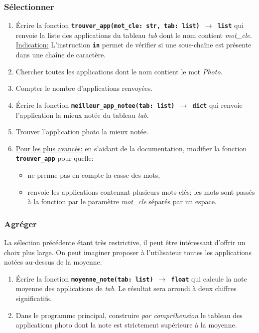 \documentclass[a4paper,11pt]{article}
\begin{document}
\subsubsection{Sélectionner}
\begin{activite}
    \begin{enumerate}
        \item Écrire la fonction \textbf{\texttt{trouver\_app(mot\_cle: str, tab: list) $\rightarrow$ list}} qui renvoie la liste des applications du tableau \emph{tab} dont le nom contient \emph{mot\_cle}.\\
              \underline{Indication:} L'instruction \textbf{\texttt{in}} permet de vérifier si une sous-chaîne est présente dans une chaîne de caractère.
        \item Chercher toutes les applications dont le nom contient le mot \emph{Photo}.
        \item Compter le nombre d'applications renvoyées.
        \item Écrire la fonction \textbf{\texttt{meilleur\_app\_notee(tab: list) $\rightarrow$ dict}} qui renvoie l'application la mieux notée du tableau \emph{tab}.
        \item Trouver l'application photo la mieux notée.
        \item \underline{Pour les plus avancés:} en s'aidant de la documentation, modifier la fonction \textbf{\texttt{trouver\_app}} pour quelle:
              \begin{itemize}
                  \item ne prenne pas en compte la casse des mots,
                  \item renvoie les applications contenant plusieurs mots-clés; les mots sont passés à la fonction par le paramètre \emph{mot\_cle} séparés par un espace.
              \end{itemize}
    \end{enumerate}
\end{activite}
\subsubsection{Agréger}
La sélection précédente étant très restrictive, il peut être intéressant d'offrir un choix plus large. On peut imaginer proposer à l'utilisateur toutes les applications notées au-dessus de la moyenne.
\begin{activite}
    \begin{enumerate}
        \item Écrire la fonction \textbf{\texttt{moyenne\_note(tab: list)  $\rightarrow$ float}} qui calcule la note moyenne des applications de \emph{tab}. Le résultat sera arrondi à deux chiffres significatifs.
        \item Dans le programme principal, construire \emph{par compréhension }le tableau des applications photo dont la note est strictement supérieure à la moyenne.
    \end{enumerate}
\end{activite}
\end{document}
